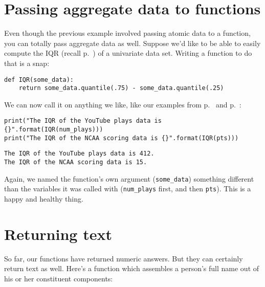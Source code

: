 \section{Passing aggregate data to functions}


Even though the previous example involved passing atomic data to a function,
you can totally pass aggregate data as well. Suppose we'd like to be able to
easily compute the IQR (recall p.~\pageref{IQR}) of a univariate data set.
Writing a function to do that is a snap:

\begin{Verbatim}[fontsize=\footnotesize,samepage=true,frame=single,framesep=3mm]
def IQR(some_data):
    return some_data.quantile(.75) - some_data.quantile(.25)
\end{Verbatim}

We can now call it on anything we like, like our examples from
p.~\pageref{YouTubeData} and p.~\pageref{NCAAData}:

\begin{Verbatim}[fontsize=\scriptsize,samepage=true,frame=single,framesep=3mm]
print("The IQR of the YouTube plays data is {}".format(IQR(num_plays)))
print("The IQR of the NCAA scoring data is {}".format(IQR(pts)))
\end{Verbatim}
\vspace{-.2in}

\begin{Verbatim}[fontsize=\small,samepage=true,frame=leftline,framesep=5mm,framerule=1mm]
The IQR of the YouTube plays data is 412.
The IQR of the NCAA scoring data is 15.
\end{Verbatim}

Again, we named the function's own argument (\texttt{some\_data}) something
different than the variables it was called with (\texttt{num\_plays} first, and
then \texttt{pts}). This is a happy and healthy thing.

\section{Returning text}

So far, our functions have returned numeric answers. But they can certainly
return text as well. Here's a function which assembles a person's full name out
of his or her constituent components:

